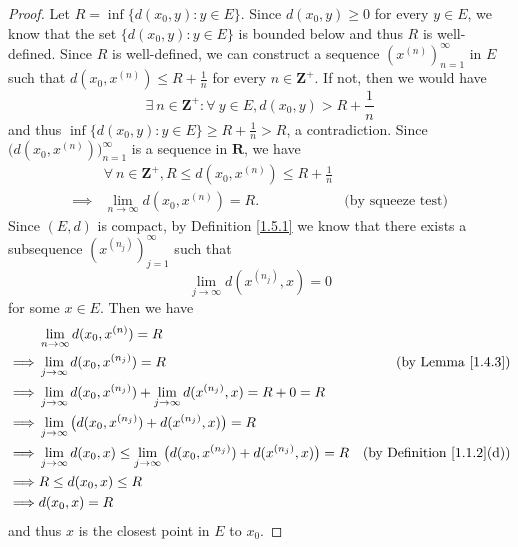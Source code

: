 \begin{proof}
    Let \(R = \inf\{d(x_0, y) : y \in E\}\).
    Since \(d(x_0, y) \geq 0\) for every \(y \in E\), we know that the set \(\{d(x_0, y) : y \in E\}\) is bounded below and thus \(R\) is well-defined.
    Since \(R\) is well-defined, we can construct a sequence \((x^{(n)})_{n = 1}^\infty\) in \(E\) such that \(d(x_0, x^{(n)}) \leq R + \frac{1}{n}\) for every \(n \in \mathbf{Z}^+\).
    If not, then we would have
    \[
        \exists\ n \in \mathbf{Z}^+ : \forall\ y \in E, d(x_0, y) > R + \frac{1}{n}
    \]
    and thus \(\inf\{d(x_0, y) : y \in E\} \geq R + \frac{1}{n} > R\), a contradiction.
    Since \(\big(d(x_0, x^{(n)})\big)_{n = 1}^\infty\) is a sequence in \(\mathbf{R}\), we have
    \begin{align*}
                 & \forall\ n \in \mathbf{Z}^+, R \leq d(x_0, x^{(n)}) \leq R + \frac{1}{n}                            \\
        \implies & \lim_{n \to \infty} d(x_0, x^{(n)}) = R.                                 & \text{(by squeeze test)}
    \end{align*}
    Since \((E, d)\) is compact, by Definition \ref{1.5.1} we know that there exists a subsequence \((x^{(n_j)})_{j = 1}^\infty\) such that
    \[
        \lim_{j \to \infty} d(x^{(n_j)}, x) = 0
    \]
    for some \(x \in E\).
    Then we have
    \begin{align*}
                 & \lim_{n \to \infty} d(x_0, x^{(n)}) = R                                                                                                          \\
        \implies & \lim_{j \to \infty} d(x_0, x^{(n_j)}) = R                                                                & \text{(by Lemma \ref{1.4.3})}         \\
        \implies & \lim_{j \to \infty} d(x_0, x^{(n_j)}) + \lim_{j \to \infty} d(x^{(n_j)}, x) = R + 0 = R                                                          \\
        \implies & \lim_{j \to \infty} \big(d(x_0, x^{(n_j)}) + d(x^{(n_j)}, x)\big) = R                                                                            \\
        \implies & \lim_{j \to \infty} d(x_0, x) \leq \lim_{j \to \infty} \big(d(x_0, x^{(n_j)}) + d(x^{(n_j)}, x)\big) = R & \text{(by Definition \ref{1.1.2}(d))} \\
        \implies & R \leq d(x_0, x) \leq R                                                                                                                          \\
        \implies & d(x_0, x) = R
    \end{align*}
    and thus \(x\) is the closest point in \(E\) to \(x_0\).
\end{proof}

